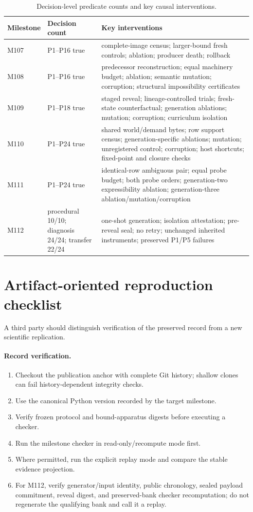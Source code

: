 \begin{table}[H]
\centering
\small
\caption{Decision-level predicate counts and key causal interventions.}
\begin{tabularx}{\textwidth}{@{}l l X@{}}
\toprule
Milestone & Decision count & Key interventions \\
\midrule
M107 & P1--P16 true & complete-image census; larger-bound fresh controls; ablation; producer death; rollback \\
M108 & P1--P16 true & predecessor reconstruction; equal machinery budget; ablation; semantic mutation; corruption; structural impossibility certificates \\
M109 & P1--P18 true & staged reveal; lineage-controlled trials; fresh-state counterfactual; generation ablations; mutation; corruption; curriculum isolation \\
M110 & P1--P24 true & shared world/demand bytes; row support census; generation-specific ablations; mutation; unregistered control; corruption; host shortcuts; fixed-point and closure checks \\
M111 & P1--P24 true & identical-row ambiguous pair; equal probe budget; both probe orders; generation-two expressibility ablation; generation-three ablation/mutation/corruption \\
M112 & procedural 10/10; diagnosis 24/24; transfer 22/24 & one-shot generation; isolation attestation; pre-reveal seal; no retry; unchanged inherited instruments; preserved P1/P5 failures \\
\bottomrule
\end{tabularx}
\end{table}

\section{Artifact-oriented reproduction checklist}
\label{app:repro}
A third party should distinguish verification of the preserved record from a new scientific replication.

\paragraph{Record verification.}
\begin{enumerate}
  \item Checkout the publication anchor with complete Git history; shallow clones can fail history-dependent integrity checks.
  \item Use the canonical Python version recorded by the target milestone.
  \item Verify frozen protocol and bound-apparatus digests before executing a checker.
  \item Run the milestone checker in read-only/recompute mode first.
  \item Where permitted, run the explicit replay mode and compare the stable evidence projection.
  \item For M112, verify generator/input identity, public chronology, sealed payload commitment, reveal digest, and preserved-bank checker recomputation; do not regenerate the qualifying bank and call it a replay.
\end{enumerate}

